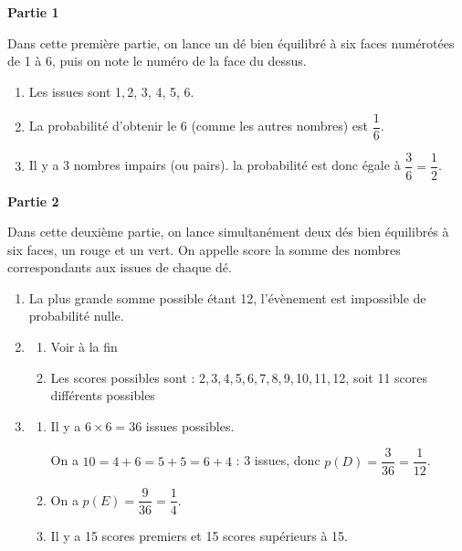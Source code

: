 
	\textbf{Partie 1}
	
	Dans cette première partie, on lance un dé bien équilibré à six faces numérotées de 1 à 6, puis on note le numéro de la face du dessus.
	
	\begin{enumerate}
		\item %
Les issues sont 1,\,2,\,\,3,\,\,4,\,\,5,\,\,6.
		\item %
La probabilité d'obtenir le 6 (comme les autres nombres) est $\dfrac{1}{6}$.
		
		\item %
Il y a 3 nombres impairs (ou pairs). la probabilité est donc égale à $\dfrac{3}{6} = \dfrac{1}{2}$.
	\end{enumerate}

	\textbf{Partie 2}
	
Dans cette deuxième partie, on lance simultanément deux dés bien équilibrés à six faces, un rouge et un vert. On appelle \og  score  \fg{} la somme des nombres correspondants aux issues  de chaque dé.
	
	\begin{enumerate}
		\item %
La plus grande somme possible étant 12, l'évènement est impossible de probabilité nulle.
		
		\item %
		
		\begin{enumerate}
			\item %
Voir à la fin 
			\item %
			Les scores possibles sont : 2,\,3,\,4,\,5,\,6,\,7,\,8,\,9,\,10,\,11,\,12, soit 11 scores différents possibles 
		\end{enumerate}
\item 
	\begin{enumerate}
		\item %
		Il y a $6 \times 6 = 36$ issues possibles.
		
On a $10 = 4 + 6 = 5 + 5  = 6 + 4$ : 3 issues, donc $p(D) = \dfrac{3}{36} = \dfrac{1}{12}$.
		\item %
On a $p(E) = \dfrac{9}{36} = \dfrac{1}{4}$.
		\item %
Il y a 15 scores premiers et 15 scores supérieurs à 15.
		\end{enumerate}
	\end{enumerate}

